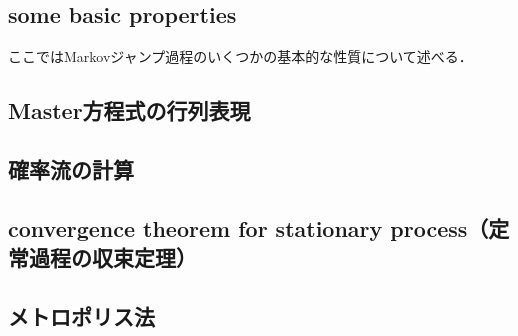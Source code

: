 \subsection{some basic properties}
ここではMarkovジャンプ過程のいくつかの基本的な性質について述べる．
\subsection{Master方程式の行列表現}

\subsection{確率流の計算}

\subsection{convergence theorem for stationary process（定常過程の収束定理）}

\subsection{メトロポリス法}